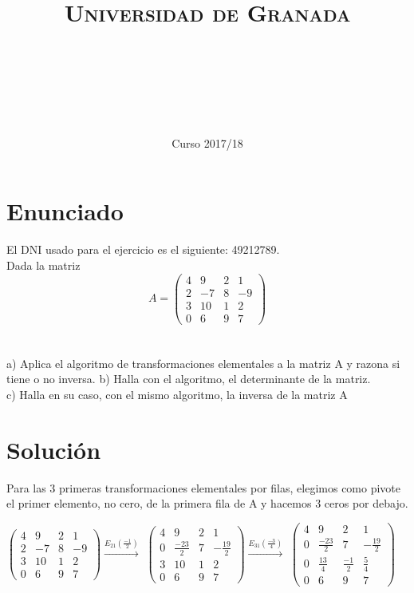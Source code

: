 \documentclass[11pt, a4paper]{article}
\title{
  \normalfont \normalsize 
  \textsc{Universidad de Granada} \\ [25pt]    %
  \horrule{0.5pt} \\[0.4cm] %
  \huge \sffamily\subject\\ %
  \horrule{2pt} \\[0.5cm] %
}
\author{\Large\sffamily{\docauthor}}
\date{\vspace{-1.5em} \normalsize \sffamily Curso 2017/18}
\newif\IfInSansMode
\theoremstyle{theorem-style}
\theoremstyle{definition-style}
\theoremstyle{remark-style}
\theoremstyle{example-style}
\begin{document}
\maketitle  %
\vfill
\begin{center}
\end{center}
\newpage
\tableofcontents    %
\newpage



\section{Enunciado}
El DNI usado para el ejercicio es el siguiente: 49212789. \\

Dada la matriz $$A = 
\begin{pmatrix}
4 & 9 & 2 & 1 \\
2 & -7 & 8 & -9 \\
3 & 10 & 1 & 2 \\
0 & 6 & 9 & 7
\end{pmatrix}
$$ \\ \\
a) Aplica el algoritmo de transformaciones elementales a la matriz A y razona si
tiene o no inversa.
b) Halla con el algoritmo, el determinante de la matriz. \\
c) Halla en su caso, con el mismo algoritmo, la inversa de la matriz A

\section{Solución}

Para las 3 primeras transformaciones elementales por filas, elegimos como pivote el primer elemento, no cero, de la primera fila de A y hacemos 3 ceros por debajo.

$
\begin{pmatrix}
4 & 9 & 2 & 1 \\
2 & -7 & 8 & -9 \\
3 & 10 & 1 & 2 \\
0 & 6 & 9 & 7
\end{pmatrix} \xrightarrow{E_{21}(\frac{-1}{2})}
$
$
\begin{pmatrix}
4 & 9 & 2 & 1 \\
0 & \frac{-23}{2} & 7 & -\frac{19}{2} \\
3 & 10 & 1 & 2 \\
0 & 6 & 9 & 7
\end{pmatrix} \xrightarrow{E_{31}(\frac{-3}{4})}
$
$
\begin{pmatrix}
4 & 9 & 2 & 1 \\
0 & \frac{-23}{2} & 7 & -\frac{19}{2} \\
0 & \frac{13}{4} & \frac{-1}{2} & \frac{5}{4} \\
0 & 6 & 9 & 7
\end{pmatrix}$
\end{document}

